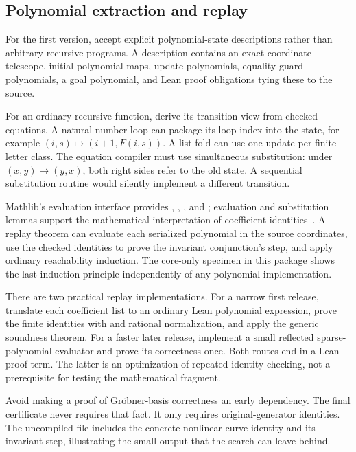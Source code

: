\subsection{Polynomial extraction and replay}

For the first version, accept explicit polynomial-state descriptions rather
than arbitrary recursive programs. A description contains an exact coordinate
telescope, initial polynomial maps, update polynomials, equality-guard
polynomials, a goal polynomial, and Lean proof obligations tying these to the
source.

For an ordinary recursive function, derive its transition view from checked
equations. A natural-number loop can package its loop index into the state,
for example $(i,s)\mapsto(i+1,F(i,s))$. A list fold can use one update per
finite letter class. The equation compiler must use simultaneous substitution:
under $(x,y)\mapsto(y,x)$, both right sides refer to the old state. A sequential
substitution routine would silently implement a different transition.

Mathlib's  evaluation interface provides
, , , and ; evaluation and
substitution lemmas support the mathematical interpretation of coefficient
identities~\cite{mathlib-mvpoly}. A replay theorem can evaluate each serialized
polynomial in the source coordinates, use the checked identities to prove the
invariant conjunction's step, and apply ordinary reachability induction.
The core-only  specimen in this package shows the
last induction principle independently of any polynomial implementation.

There are two practical replay implementations. For a narrow first release,
translate each coefficient list to an ordinary Lean polynomial expression,
prove the finite identities with  and rational normalization, and
apply the generic soundness theorem. For a faster later release, implement a
small reflected sparse-polynomial evaluator and prove its correctness once.
Both routes end in a Lean proof term. The latter is an optimization of repeated
identity checking, not a prerequisite for testing the mathematical fragment.

Avoid making a proof of Gr\"obner-basis correctness an early dependency. The
final certificate never requires that fact. It only requires original-generator
identities. The uncompiled  file includes the concrete
nonlinear-curve identity and its invariant step, illustrating the small output
that the search can leave behind.

